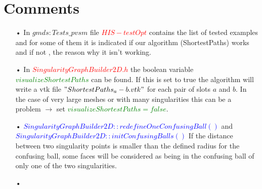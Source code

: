 \documentclass[a4paper]{report}
\begin{document}
 \newpage
\section{Comments}
{
\begin{itemize}
\item[•] In $gmds: Tests\_pvsm$ file \textcolor{red}{$HIS-testOpt$} contains the list of tested examples and for some of them it is indicated if our algorithm (ShortestPaths) works and if not , the reason why it isn't working. 
\item[•] In \textcolor{red}{$SingularityGraphBuilder2D.h$} the boolean variable \textcolor{green}{$visualizeShortestPaths$} can be found. If this is set to true the algorithm will write a vtk file $"ShortestPaths_a-b.vtk"$ for each pair of slots $a$ and $b$. 
In the case of very large meshes or with many singularities this can be a problem $\rightarrow$  set \textcolor{green}{$visualizeShortestPaths = false$}.
\item[•] \textcolor{blue}{$SingularityGraphBuilder2D::redefineOneConfusingBall()$} and \textcolor{blue}{$SingularityGraphBuilder2D::initConfusingBalls()$}
\newline
If the distance between two singularity points is smaller than the defined radius for the confusing ball, some faces will be considered as being in the confusing ball of only one of the   two singularities.
\item[•]
\end{itemize}
}


%



%
\end{document}
